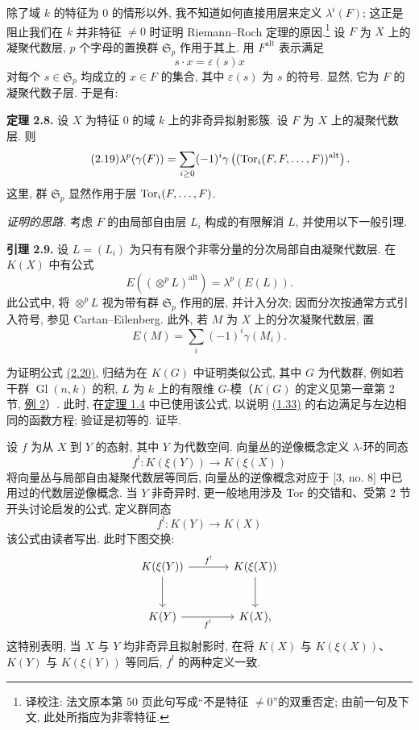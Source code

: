 除了域 $k$ 的特征为 $0$ 的情形以外, 我不知道如何直接用层来定义 $\lambda^i(F)$; 这正是阻止我们在 $k$ 并非特征 $\ne0$ 时证明 Riemann--Roch 定理的原因.\footnote{译校注: 法文原本第 50 页此句写成“不是特征 $\ne0$”的双重否定; 由前一句及下文, 此处所指应为非零特征.} 设 $F$ 为 $X$ 上的凝聚代数层, $p$ 个字母的置换群 $\mathfrak S_p$ 作用于其上. 用 $F^{\mathrm{alt}}$ 表示满足
\[
 s\cdot x=\varepsilon(s)x
\]
对每个 $s\in\mathfrak S_p$ 均成立的 $x\in F$ 的集合, 其中 $\varepsilon(s)$ 为 $s$ 的符号. 显然, 它为 $F$ 的凝聚代数子层. 于是有:

\textbf{定理 2.8.} 设 $X$ 为特征 $0$ 的域 $k$ 上的非奇异拟射影簇. 设 $F$ 为 $X$ 上的凝聚代数层. 则
\begin{equation}\tag{2.19}
 \lambda^p(\gamma(F))=\sum_{i\geq 0}(-1)^i\gamma\left((\operatorname{Tor}_i(F,F,\ldots,F))^{\mathrm{alt}}\right).
\end{equation}
这里, 群 $\mathfrak S_p$ 显然作用于层 $\operatorname{Tor}_i(F,\ldots,F)$.

\emph{证明的思路.} 考虑 $F$ 的由局部自由层 $L_i$ 构成的有限解消 $L$, 并使用以下一般引理.

\textbf{引理 2.9.} 设 $L=(L_i)$ 为只有有限个非零分量的分次局部自由凝聚代数层. 在 $K(X)$ 中有公式
\begin{equation}\tag{2.20}
 E\left((\otimes^p L)^{\mathrm{alt}}\right)=\lambda^p(E(L)).
\end{equation}
此公式中, 将 $\otimes^pL$ 视为带有群 $\mathfrak S_p$ 作用的层, 并计入分次; 因而分次按通常方式引入符号, 参见 Cartan--Eilenberg. 此外, 若 $M$ 为 $X$ 上的分次凝聚代数层, 置
\[
 E(M)=\sum_i(-1)^i\gamma(M_i).
\]

为证明公式 \hyperlink{sga6.e00.eq.2-20}{(2.20)}, 归结为在 $K(G)$ 中证明类似公式, 其中 $G$ 为代数群, 例如若干群 $\operatorname{Gl}(n,k)$ 的积, $L$ 为 $k$ 上的有限维 $G$-模（$K(G)$ 的定义见第一章第 2 节, \hyperlink{sga6.e00.ex.2-2}{例 2}）. 此时, 在\hyperlink{sga6.e00.thm.1-4}{定理 1.4} 中已使用该公式, 以说明 \hyperlink{sga6.e00.eq.1-33}{(1.33)} 的右边满足与左边相同的函数方程; 验证是初等的. 证毕.

设 $f$ 为从 $X$ 到 $Y$ 的态射, 其中 $Y$ 为代数空间. 向量丛的逆像概念定义 $\lambda$-环的同态
\[
 f^!:K(\xi(Y))\longrightarrow K(\xi(X))
\]
将向量丛与局部自由凝聚代数层等同后, 向量丛的逆像概念对应于 [3, no. 8] 中已用过的代数层逆像概念. 当 $Y$ 非奇异时, 更一般地用涉及 Tor 的交错和、受第 2 节开头讨论启发的公式, 定义群同态
\begin{equation}\tag{2.21}
 f^!:K(Y)\longrightarrow K(X)
\end{equation}
该公式由读者写出. 此时下图交换:
\[
\begin{tikzcd}[column sep=large,row sep=large]
K(\xi(Y)) \arrow[r,"f^!"] \arrow[d] & K(\xi(X)) \arrow[d]\\
K(Y) \arrow[r,"f^!"'] & K(X),
\end{tikzcd}
\]
这特别表明, 当 $X$ 与 $Y$ 均非奇异且拟射影时, 在将 $K(X)$ 与 $K(\xi(X))$、$K(Y)$ 与 $K(\xi(Y))$ 等同后, $f^!$ 的两种定义一致.

